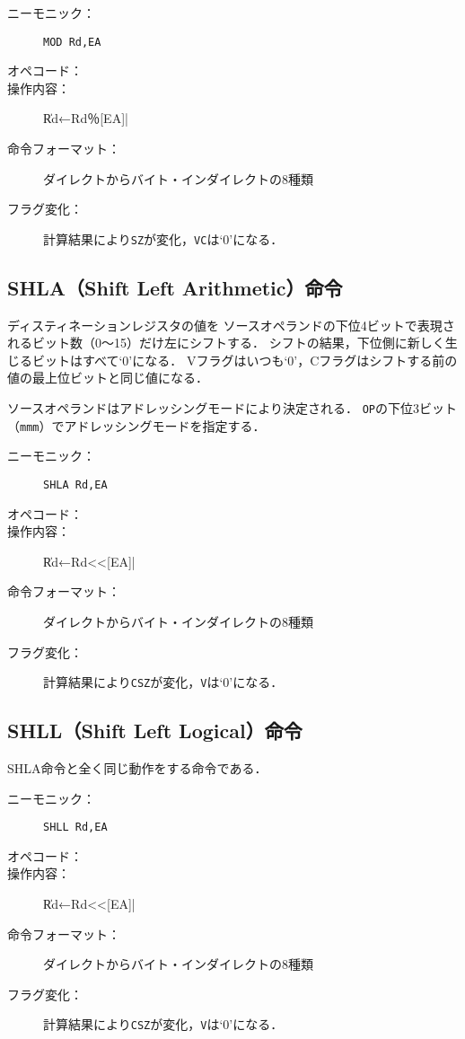 \begin{description}
\item[ニーモニック：] \texttt{MOD Rd,EA}
\item[オペコード：] 
\item[操作内容：] \|Rd←Rd％[EA]|
\item[命令フォーマット：] ダイレクトからバイト・インダイレクトの8種類
\item[フラグ変化：] 計算結果により\texttt{SZ}が変化，\texttt{VC}は`0'になる．
\end{description}

\subsection{SHLA（Shift Left Arithmetic）命令}
ディスティネーションレジスタの値を
ソースオペランドの下位4ビットで表現されるビット数（0〜15）だけ左にシフトする．
シフトの結果，下位側に新しく生じるビットはすべて`0'になる．
Vフラグはいつも`0'，Cフラグはシフトする前の値の最上位ビットと同じ値になる．

ソースオペランドはアドレッシングモードにより決定される．
\texttt{OP}の下位3ビット（\texttt{mmm}）でアドレッシングモードを指定する．

\begin{description}
\item[ニーモニック：] \texttt{SHLA Rd,EA}
\item[オペコード：] 
\item[操作内容：] \|Rd←Rd<<[EA]|
\item[命令フォーマット：] ダイレクトからバイト・インダイレクトの8種類
\item[フラグ変化：] 計算結果により\texttt{CSZ}が変化，\texttt{V}は`0'になる．
\end{description}

\subsection{SHLL（Shift Left Logical）命令}
SHLA命令と全く同じ動作をする命令である．

\begin{description}
\item[ニーモニック：] \texttt{SHLL Rd,EA}
\item[オペコード：] 
\item[操作内容：] \|Rd←Rd<<[EA]|
\item[命令フォーマット：] ダイレクトからバイト・インダイレクトの8種類
\item[フラグ変化：] 計算結果により\texttt{CSZ}が変化，\texttt{V}は`0'になる．
\end{description}

